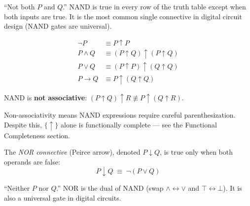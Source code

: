 \begin{remark}
``Not both $P$ and $Q$.'' NAND is true in every row of the truth table except
when both inputs are true. It is the most common single connective in digital
circuit design (NAND gates are universal).
\end{remark}

\begin{remark}
\begin{align*}
\neg P &\equiv P \uparrow P \\
P \wedge Q &\equiv (P \uparrow Q) \uparrow (P \uparrow Q) \\
P \vee Q &\equiv (P \uparrow P) \uparrow (Q \uparrow Q) \\
P \rightarrow Q &\equiv P \uparrow (Q \uparrow Q)
\end{align*}
\end{remark}

\begin{proposition}
\label{prop:nand-complete}
NAND is \textbf{not associative}: $(P \uparrow Q) \uparrow R \not\equiv P \uparrow (Q \uparrow R)$.
\end{proposition}

\begin{remark}[Consequence]
Non-associativity means NAND expressions require careful parenthesization.
Despite this, $\{\uparrow\}$ alone is functionally complete — see the
Functional Completeness section.
\end{remark}

\begin{tcolorbox}[colback=propbox, colframe=propborder, arc=2pt,
  left=6pt, right=6pt, top=4pt, bottom=4pt,
  title={\small\textbf{Definition (NOR — Peirce Arrow)}},
  fonttitle=\small\bfseries]
\label{def:nor}
The \emph{NOR connective} (Peirce arrow), denoted $P \downarrow Q$, is true
only when both operands are false:
\[
P \downarrow Q \;\equiv\; \neg(P \vee Q)
\]
\end{tcolorbox}

\begin{remark}
``Neither $P$ nor $Q$.'' NOR is the dual of NAND (swap $\wedge \leftrightarrow \vee$
and $\top \leftrightarrow \bot$). It is also a universal gate in digital circuits.
\end{remark}

